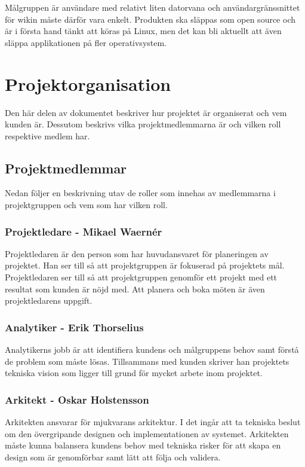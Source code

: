 Målgruppen är användare med relativt liten datorvana och användargränssnittet för wikin måste därför vara enkelt. Produkten ska släppas som open source och är i första hand tänkt att köras på Linux, men det kan bli aktuellt att även släppa applikationen på fler operativsystem.

\section{Projektorganisation}
Den här delen av dokumentet beskriver hur projektet är organiserat och vem kunden är. Dessutom beskrivs vilka projektmedlemmarna är och vilken roll respektive medlem har.

\subsection{Projektmedlemmar}
Nedan följer en beskrivning utav de roller som innehas av medlemmarna i projektgruppen och vem som har vilken roll.

\subsubsection*{Projektledare - Mikael Waernér}
Projektledaren är den person som har huvudansvaret för planeringen av projektet. Han ser till så att projektgruppen är fokuserad på projektets mål. Projektledaren ser till så att projektgruppen genomför ett projekt med ett resultat som kunden är nöjd med. Att planera och boka möten är även projektledarens uppgift.

\subsubsection*{Analytiker - Erik Thorselius}
Analytikerns jobb är att identifiera kundens och målgruppens behov samt förstå de problem som måste lösas. Tillsammans med kunden skriver han projektets tekniska vision som ligger till grund för mycket arbete inom projektet.

\subsubsection*{Arkitekt - Oskar Holstensson}
Arkitekten ansvarar för mjukvarans arkitektur. I det ingår att ta tekniska beslut om den övergripande designen och implementationen av systemet. Arkitekten måste kunna balansera kundens behov med tekniska risker för att skapa en design som är genomförbar samt lätt att följa och validera.

